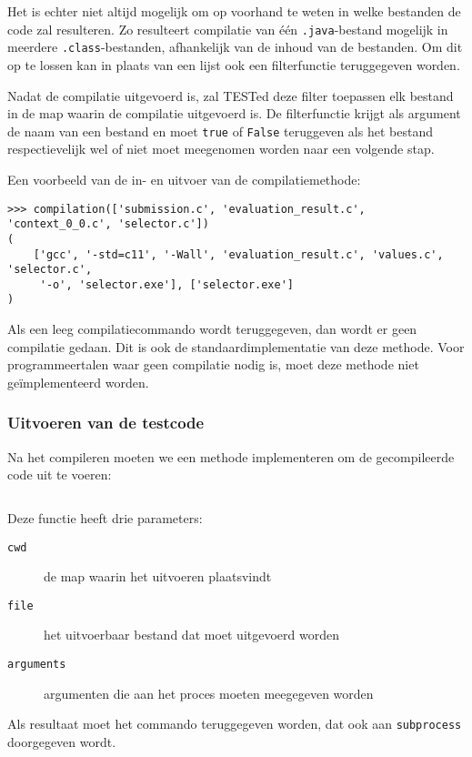 Het is echter niet altijd mogelijk om op voorhand te weten in welke bestanden de code zal resulteren.
Zo resulteert compilatie van één \texttt{.java}-bestand mogelijk in meerdere \texttt{.class}-bestanden, afhankelijk van de inhoud van de bestanden.
Om dit op te lossen kan in plaats van een lijst ook een filterfunctie teruggegeven worden.

Nadat de compilatie uitgevoerd is, zal TESTed deze filter toepassen elk bestand in de map waarin de compilatie uitgevoerd is.
De filterfunctie krijgt als argument de naam van een bestand en moet \texttt{true} of \texttt{False} teruggeven als het bestand respectievelijk wel of niet moet meegenomen worden naar een volgende stap.

Een voorbeeld van de in- en uitvoer van de compilatiemethode:

\begin{verbatim}
>>> compilation(['submission.c', 'evaluation_result.c', 'context_0_0.c', 'selector.c'])
(
    ['gcc', '-std=c11', '-Wall', 'evaluation_result.c', 'values.c', 'selector.c',
     '-o', 'selector.exe'], ['selector.exe']
)
\end{verbatim}

Als een leeg compilatiecommando wordt teruggegeven, dan wordt er geen compilatie gedaan.
Dit is ook de standaardimplementatie van deze methode.
Voor programmeertalen waar geen compilatie nodig is, moet deze methode niet geïmplementeerd worden.

\subsubsection{Uitvoeren van de testcode}

Na het compileren moeten we een methode implementeren om de gecompileerde code uit te voeren:

\inputminted[firstline=18,lastline=20,gobble=4]{python}{sources/c-config.py}

Deze functie heeft drie parameters:

\begin{description}
    \item[\texttt{cwd}] de map waarin het uitvoeren plaatsvindt
    \item[\texttt{file}] het uitvoerbaar bestand dat moet uitgevoerd worden
    \item[\texttt{arguments}] argumenten die aan het proces moeten meegegeven worden
\end{description}

Als resultaat moet het commando teruggegeven worden, dat ook aan \texttt{subprocess} doorgegeven wordt.

